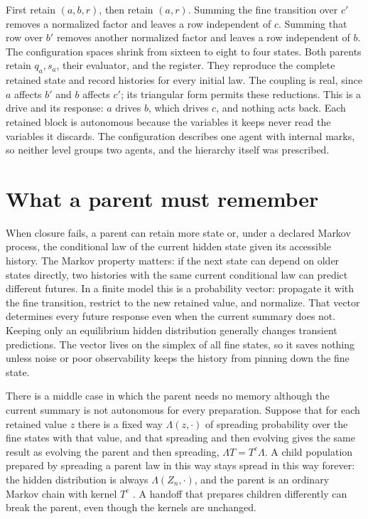 First retain $(a,b,r)$, then retain $(a,r)$. Summing the fine transition
over $c'$ removes a normalized factor and leaves a row independent of $c$.
Summing that row over $b'$ removes another normalized factor and leaves a
row independent of $b$. The configuration spaces shrink from sixteen to
eight to four states. Both parents retain $q_a,s_a$, their evaluator, and
the register. They reproduce the complete retained state and record
histories for every initial law. The coupling is real, since $a$ affects
$b'$ and $b$ affects $c'$; its triangular form permits these reductions.
This is a drive and its response: $a$ drives $b$, which drives $c$, and
nothing acts back. Each retained block is autonomous because the variables
it keeps never read the variables it discards. The configuration describes
one agent with internal marks, so neither level groups two agents, and the
hierarchy itself was prescribed.

\section{What a parent must remember}

When closure fails, a parent can retain more state or, under a declared
Markov process, the conditional law of the current hidden state given its
accessible history. The Markov property matters: if the next state can depend
on older states directly, two histories with the same current conditional law
can predict different futures. In a finite model this is a probability
vector: propagate it with
the fine transition, restrict to the new retained value, and normalize.
That vector determines every future response even when the current summary
does not. Keeping only an equilibrium hidden distribution generally changes
transient predictions. The vector lives on the simplex of all fine states,
so it saves nothing unless noise or poor observability keeps the history from
pinning down the fine state.

There is a middle case in which the parent needs no memory although the
current summary is not autonomous for every preparation. Suppose that for
each retained value $z$ there is a fixed way $\Lambda(z,\cdot)$ of spreading
probability over the fine states with that value, and that spreading and then
evolving gives the same result as evolving the parent and then spreading,
$\Lambda T=T^c\Lambda$. A child population prepared by spreading a parent law
in this way stays spread in this way forever: the hidden distribution is
always $\Lambda(Z_n,\cdot)$, and the parent is an ordinary Markov chain with
kernel $T^c$ \citep{RogersPitman1981}. A handoff that prepares children
differently can break the parent, even though the kernels are unchanged.

